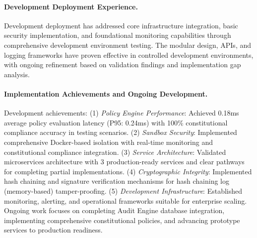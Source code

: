 \documentclass[manuscript,screen,9pt]{acmart}
\begin{document}
\paragraph{Development Deployment Experience.} Development deployment has addressed core infrastructure integration, basic security implementation, and foundational monitoring capabilities through comprehensive development environment testing. The modular design, APIs, and logging frameworks have proven effective in controlled development environments, with ongoing refinement based on validation findings and implementation gap analysis.

\paragraph{Implementation Achievements and Ongoing Development.}
Development achievements: (1) \textit{Policy Engine Performance}: Achieved 0.18ms average policy evaluation latency (P95: 0.24ms) with 100\% constitutional compliance accuracy in testing scenarios. (2) \textit{Sandbox Security}: Implemented comprehensive Docker-based isolation with real-time monitoring and constitutional compliance integration. (3) \textit{Service Architecture}: Validated microservices architecture with 3 production-ready services and clear pathways for completing partial implementations. (4) \textit{Cryptographic Integrity}: Implemented hash chaining and signature verification mechanisms for hash chaining log (memory-based) tamper-proofing. (5) \textit{Development Infrastructure}: Established monitoring, alerting, and operational frameworks suitable for enterprise scaling. Ongoing work focuses on completing Audit Engine database integration, implementing comprehensive constitutional policies, and advancing prototype services to production readiness.
\end{document}
